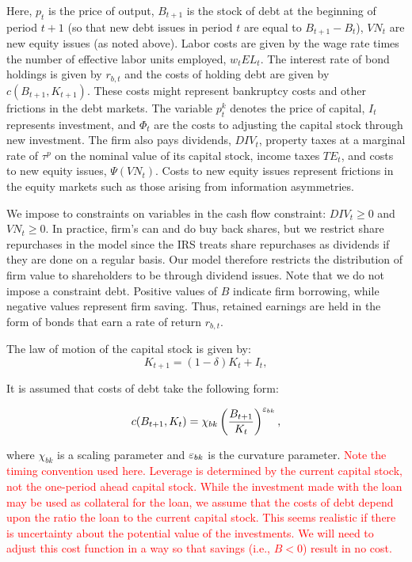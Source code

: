 \noindent\noindent Here, $p_{t}$ is the price of output, $B_{t+1}$ is the stock of debt at the beginning of period $t+1$ (so that new debt issues in period $t$ are equal to $B_{t+1}-B_{t}$), $VN_{t}$ are new equity issues (as noted above).  Labor costs are given by the wage rate times the number of effective labor units employed, $w_{t}EL_{t}$.  The interest rate of bond holdings is given by $r_{b,t}$ and the costs of holding debt are given by $c(B_{t+1},K_{t+1})$.  These costs might represent bankruptcy costs and other frictions in the debt markets.  The variable $p^{k}_{t}$ denotes the price of capital, $I_{t}$ represents investment, and $\Phi_{t}$ are the costs to adjusting the capital stock through new investment.  The firm also pays dividends, $DIV_{t}$, property taxes at a marginal rate of $\tau^{p}$ on the nominal value of its capital stock, income taxes $TE_{t}$, and costs to new equity issues, $\Psi(VN_{t})$.  Costs to new equity issues represent frictions in the equity markets such as those arising from information asymmetries. 

We impose to constraints on variables in the cash flow constraint: $DIV_{t}\geq0$ and $VN_{t}\geq0$.  In practice, firm's can and do buy back shares, but we restrict share repurchases in the model since the IRS treats share repurchases as dividends if they are done on a regular basis.  Our model therefore restricts the distribution of firm value to shareholders to be through dividend issues.  Note that we do not impose a constraint debt.  Positive values of $B$ indicate firm borrowing, while negative values represent firm saving.  Thus, retained earnings are held in the form of bonds that earn a rate of return $r_{b,t}$.

The law of motion of the capital stock is given by:
\begin{equation}
\label{eqn:lom_capital}
K_{t+1}=(1-\delta)K_{t} + I_{t},
\end{equation}

It is assumed that costs of debt take the following form:

\begin{equation}
\label{eqn:debt_cost}
c(B_{t+1},K_{t}) = \chi_{bk}\left(\frac{B_{t+1}}{K_{t}}\right)^{\varepsilon_{bk}},
\end{equation}

\noindent\noindent where $\chi_{bk}$ is a scaling parameter and $\varepsilon_{bk}$ is the curvature parameter. \textcolor{red}{Note the timing convention used here.  Leverage is determined by the current capital stock, not the one-period ahead capital stock.  While the investment made with the loan may be used as collateral for the loan, we assume that the costs of debt depend upon the ratio the loan to the current capital stock. This seems realistic if there is uncertainty about the potential value of the investments.  We will need to adjust this cost function in a way so that savings (i.e., $B<0$) result in no cost.}

